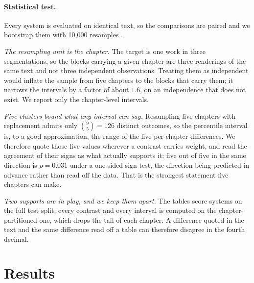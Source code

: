 \documentclass[10pt,twocolumn,a4paper]{article}
\begin{document}
\paragraph{Statistical test.} Every system is evaluated on identical text, so
the comparisons are paired and we bootstrap them with 10{,}000 resamples
\cite{koehn2004}.

\emph{The resampling unit is the chapter.} The target is one work in three
segmentations, so the blocks carrying a given chapter are three renderings of
the same text and not three independent observations. Treating them as
independent would inflate the sample from five chapters to the blocks that carry
them; it narrows the intervals by a factor of about $1.6$, on an independence
that does not exist. We report only the chapter-level intervals.

\emph{Five clusters bound what any interval can say.} Resampling five chapters
with replacement admits only $\binom{9}{5}=126$ distinct outcomes, so the
percentile interval is, to a good approximation, the range of the five
per-chapter differences. We therefore quote those five values wherever a
contrast carries weight, and read the agreement of their signs as what actually
supports it: five out of five in the same direction is $p=0.031$ under a
one-sided sign test, the direction being predicted in advance rather than read
off the data. That is the strongest statement five chapters can make.

\emph{Two supports are in play, and we keep them apart.} The tables score
systems on the full test split; every contrast and every interval is computed on
the chapter-partitioned one, which drops the tail of each chapter. A difference
quoted in the text and the same difference read off a table can therefore
disagree in the fourth decimal.

\section{Results}
\label{sec:results}
\end{document}
